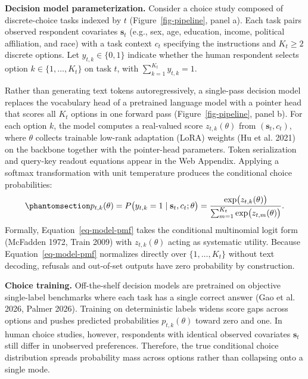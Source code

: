 \documentclass[
  11pt,
  letterpaper,
]{article}
\begin{document}
\textbf{Decision model parameterization.} Consider a choice study
composed of discrete-choice tasks indexed by \(t\)
(Figure~\ref{fig-pipeline}, panel a). Each task pairs observed
respondent covariates \(\mathbf{s}_t\) (e.g., sex, age, education,
income, political affiliation, and race) with a task context \(c_t\)
specifying the instructions and \(K_t \ge 2\) discrete options. Let
\(y_{t,k} \in \{0, 1\}\) indicate whether the human respondent selects
option \(k \in \{1, \dots, K_t\}\) on task \(t\), with
\(\sum_{k=1}^{K_t} y_{t,k} = 1\).

Rather than generating text tokens autoregressively, a single-pass
decision model replaces the vocabulary head of a pretrained language
model with a pointer head that scores all \(K_t\) options in one forward
pass (Figure~\ref{fig-pipeline}, panel b). For each option \(k\), the
model computes a real-valued score \(z_{t,k}(\theta)\) from
\((\mathbf{s}_t, c_t)\), where \(\theta\) collects trainable low-rank
adaptation (LoRA) weights (Hu et al. 2021) on the backbone together with
the pointer-head parameters. Token serialization and query-key readout
equations appear in the Web Appendix. Applying a softmax transformation
with unit temperature produces the conditional choice probabilities:
\begin{equation}\protect\phantomsection\label{eq-model-pmf}{
p_{t,k}(\theta) = P\big(y_{t,k} = 1 \mid \mathbf{s}_t, c_t; \theta\big) = \frac{\exp\!\big(z_{t,k}(\theta)\big)}{\sum_{m=1}^{K_t} \exp\!\big(z_{t,m}(\theta)\big)}.
}\end{equation} Formally, Equation~\ref{eq-model-pmf} takes the
conditional multinomial logit form (McFadden 1972, Train 2009) with
\(z_{t,k}(\theta)\) acting as systematic utility. Because
Equation~\ref{eq-model-pmf} normalizes directly over
\(\{1, \dots, K_t\}\) without text decoding, refusals and out-of-set
outputs have zero probability by construction.

\textbf{Choice training.} Off-the-shelf decision models are pretrained
on objective single-label benchmarks where each task has a single
correct answer (Gao et al. 2026, Palmer 2026). Training on deterministic
labels widens score gaps across options and pushes predicted
probabilities \(p_{t,k}(\theta)\) toward zero and one. In human choice
studies, however, respondents with identical observed covariates
\(\mathbf{s}_t\) still differ in unobserved preferences. Therefore, the
true conditional choice distribution spreads probability mass across
options rather than collapsing onto a single mode.
\end{document}
